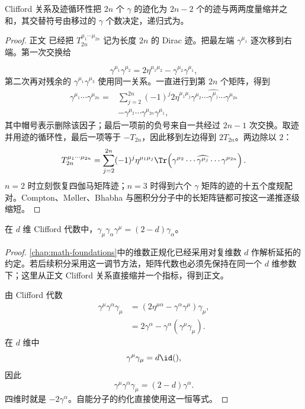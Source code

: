 \begin{lemma}
Clifford 关系及迹循环性把 $2n$ 个 $\gamma$ 的迹化为 $2n-2$ 个的迹与两两度量缩并之和，其交替符号由移过的 $\gamma$ 个数决定，递归式为。
\end{lemma}

\begin{proof}
正文 已经把 $T_{2n}^{\mu_1\cdots\mu_{2n}}$ 记为长度 $2n$ 的 Dirac 迹。把最左端 $\gamma^{\mu_1}$ 逐次移到右端。第一次交换给

\begin{equation*}
 \gamma^{\mu_1}\gamma^{\mu_2}
 =2\eta^{\mu_1\mu_2}-\gamma^{\mu_2}\gamma^{\mu_1},
\end{equation*}
第二次再对残余的 $\gamma^{\mu_1}\gamma^{\mu_3}$ 使用同一关系。一直进行到第 $2n$ 个矩阵，得到
\begin{align*}
 \gamma^{\mu_1}\cdots\gamma^{\mu_{2n}}
 =&\sum_{j=2}^{2n}(-1)^j 2\eta^{\mu_1\mu_j}
 \gamma^{\mu_2}\cdots\widehat{\gamma^{\mu_j}}\cdots\gamma^{\mu_{2n}}
 \nonumber\\
 &-\gamma^{\mu_2}\cdots\gamma^{\mu_{2n}}\gamma^{\mu_1},
 \end{align*}
其中帽号表示删除该因子；最后一项前的负号来自一共经过 $2n-1$ 次交换。取迹并用迹的循环性，最后一项等于 $-T_{2n}$，因此移到左边得到 $2T_{2n}$。两边除以 $2$：
\begin{equation*}
 {
 T_{2n}^{\mu_1\cdots\mu_{2n}}
 =\sum_{j=2}^{2n}(-1)^j
 \eta^{\mu_1\mu_j}
 \Tr\!\left(
 \gamma^{\mu_2}\cdots\widehat{\gamma^{\mu_j}}\cdots\gamma^{\mu_{2n}}
 \right).}
 \end{equation*}
$n=2$ 时立刻恢复四伽马矩阵迹；$n=3$ 时得到六个 $\gamma$ 矩阵的迹的十五个度规配对。Compton、M\o ller、Bhabha 与圈积分分子中的长矩阵链都可按这一递推逐级缩短。
\end{proof}

\begin{lemma}
在 $d$ 维 Clifford 代数中，$\gamma_\mu\gamma_\alpha\gamma^\mu=(2-d)\gamma_\alpha$。
\end{lemma}

\begin{proof}
\cref{chap:math-foundations}中的维数正规化已经采用对复维数 $d$ 作解析延拓的约定。若后续积分采用这一调节方法，矩阵代数也必须先保持在同一个 $d$ 维参数下；这里从正文 Clifford 关系直接缩并一个指标，得到正文。



由 Clifford 代数
\begin{align*}
 \gamma^\mu\gamma^\alpha\gamma_\mu
 &=(2\eta^{\mu\alpha}-\gamma^\alpha\gamma^\mu)\gamma_\mu,\\
 &=2\gamma^\alpha-\gamma^\alpha(\gamma^\mu\gamma_\mu).
\end{align*}
在 $d$ 维中
\begin{equation*}
 \gamma^\mu\gamma_\mu=d\id(),
\end{equation*}
因此
\begin{equation*}
 {
 \gamma^\mu\gamma^\alpha\gamma_\mu=(2-d)\gamma^\alpha.}
 \end{equation*}
四维时就是 $-2\gamma^\alpha$。自能分子的约化直接使用这一恒等式。
\end{proof}

